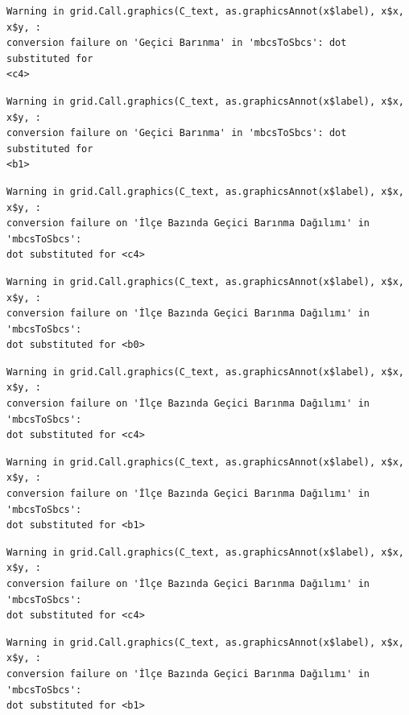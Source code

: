 \documentclass[
  11pt,
  a4paper,
  DIV=11,
  numbers=noendperiod]{scrartcl}
\begin{document}
\begin{verbatim}
Warning in grid.Call.graphics(C_text, as.graphicsAnnot(x$label), x$x, x$y, :
conversion failure on 'Geçici Barınma' in 'mbcsToSbcs': dot substituted for
<c4>
\end{verbatim}

\begin{verbatim}
Warning in grid.Call.graphics(C_text, as.graphicsAnnot(x$label), x$x, x$y, :
conversion failure on 'Geçici Barınma' in 'mbcsToSbcs': dot substituted for
<b1>
\end{verbatim}

\begin{verbatim}
Warning in grid.Call.graphics(C_text, as.graphicsAnnot(x$label), x$x, x$y, :
conversion failure on 'İlçe Bazında Geçici Barınma Dağılımı' in 'mbcsToSbcs':
dot substituted for <c4>
\end{verbatim}

\begin{verbatim}
Warning in grid.Call.graphics(C_text, as.graphicsAnnot(x$label), x$x, x$y, :
conversion failure on 'İlçe Bazında Geçici Barınma Dağılımı' in 'mbcsToSbcs':
dot substituted for <b0>
\end{verbatim}

\begin{verbatim}
Warning in grid.Call.graphics(C_text, as.graphicsAnnot(x$label), x$x, x$y, :
conversion failure on 'İlçe Bazında Geçici Barınma Dağılımı' in 'mbcsToSbcs':
dot substituted for <c4>
\end{verbatim}

\begin{verbatim}
Warning in grid.Call.graphics(C_text, as.graphicsAnnot(x$label), x$x, x$y, :
conversion failure on 'İlçe Bazında Geçici Barınma Dağılımı' in 'mbcsToSbcs':
dot substituted for <b1>
\end{verbatim}

\begin{verbatim}
Warning in grid.Call.graphics(C_text, as.graphicsAnnot(x$label), x$x, x$y, :
conversion failure on 'İlçe Bazında Geçici Barınma Dağılımı' in 'mbcsToSbcs':
dot substituted for <c4>
\end{verbatim}

\begin{verbatim}
Warning in grid.Call.graphics(C_text, as.graphicsAnnot(x$label), x$x, x$y, :
conversion failure on 'İlçe Bazında Geçici Barınma Dağılımı' in 'mbcsToSbcs':
dot substituted for <b1>
\end{verbatim}
\end{document}

